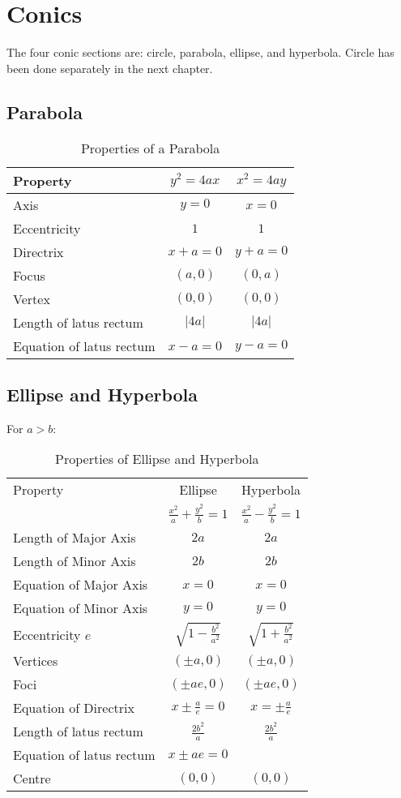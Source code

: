\chapter{Conics}
The four conic sections are: circle, parabola, ellipse, and hyperbola. Circle has been done separately in the next chapter.


\section{Parabola}
\begin{table}[htbp]
	\centering
	\begin{tabular}{l c c}
		\toprule
		Property & $y^2=4ax$ & $x^2=4ay$\\
		\midrule

		Axis & $y=0$ & $x=0$\\
		Eccentricity & $1$ & $1$\\
		Directrix & $x+a=0$ & $y+a=0$\\
		Focus & $(a,0)$ & $(0,a)$\\
		Vertex & $(0,0)$ & $(0,0)$\\
		Length of latus rectum & $\lvert 4a \rvert$ & $\lvert 4a \rvert$\\
		Equation of latus rectum & $x-a=0$ & $y-a=0$\\
		\bottomrule
	\end{tabular}
	\caption{Properties of a Parabola}
	\label{parabola}
\end{table}


\section{Ellipse and Hyperbola}
For $a>b$:
\begin{table}[htbp]
	\centering
	\renewcommand{\arraystretch}{1.2}
	\begin{tabular}{l c c}
		\toprule
		Property & Ellipse & Hyperbola\\
		 & $\frac{x^2}{a}+\frac{y^2}{b}=1$ & $\frac{x^2}{a}-\frac{y^2}{b}=1$\\
		\midrule
		Length of Major Axis & $2a$ & $2a$\\
		Length of Minor Axis & $2b$ & $2b$\\
		Equation of Major Axis & $x=0$ & $x=0$\\
		Equation of Minor Axis & $y=0$ & $y=0$\\
		Eccentricity $e$ & $\sqrt{1-\frac{b^2}{a^2}}$ & $\sqrt{1+\frac{b^2}{a^2}}$\\
		Vertices & $(\pm a,0)$ & $(\pm a,0)$\\
		Foci & $(\pm ae,0)$ & $(\pm ae,0)$\\
		Equation of Directrix & $x \pm \frac{a}{e}=0$ & $x=\pm\frac{a}{e}$\\
		Length of latus rectum & $\frac{2b^2}{a}$ & $\frac{2b^2}{a}$\\
		Equation of latus rectum & $x \pm ae=0$ & \\
		Centre & $(0,0)$ & $(0,0)$\\
		\bottomrule
	\end{tabular}
	\caption{Properties of Ellipse and Hyperbola}
	\label{ell & hyp}
\end{table}


